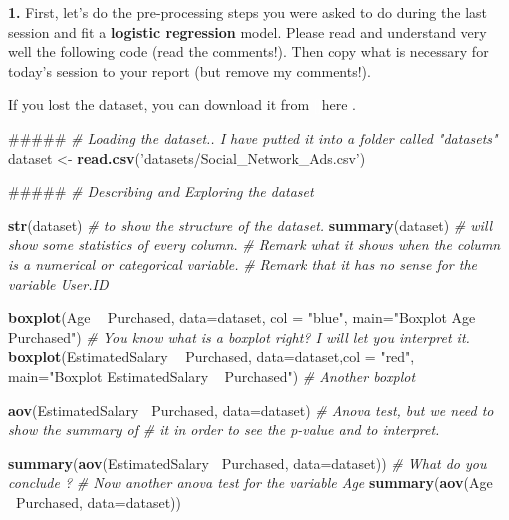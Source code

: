 \documentclass[]{book}
\newenvironment{Shaded}{\begin{snugshade}}{\end{snugshade}}
\newcommand{\KeywordTok}[1]{\textcolor[rgb]{0.13,0.29,0.53}{\textbf{#1}}}
\newcommand{\DataTypeTok}[1]{\textcolor[rgb]{0.13,0.29,0.53}{#1}}
\newcommand{\StringTok}[1]{\textcolor[rgb]{0.31,0.60,0.02}{#1}}
\newcommand{\CommentTok}[1]{\textcolor[rgb]{0.56,0.35,0.01}{\textit{#1}}}
\newcommand{\OperatorTok}[1]{\textcolor[rgb]{0.81,0.36,0.00}{\textbf{#1}}}
\newcommand{\NormalTok}[1]{#1}
\theoremstyle{definition}
\theoremstyle{definition}
\theoremstyle{definition}
\theoremstyle{remark}
\begin{document}
\textbf{1.} First, let's do the pre-processing steps you were asked to
do during the last session and fit a \textbf{logistic regression} model.
Please read and understand very well the following code (read the
comments!). Then copy what is necessary for today's session to your
report (but remove my comments!).

If you lost the dataset, you can download it from
\textcolor{white}{[}\faTable\textcolor{white}{]}here .

\begin{Shaded}
\begin{Highlighting}[]

\NormalTok{#####}
\CommentTok{# Loading the dataset.. I have putted it into a folder called "datasets"}
\NormalTok{dataset <-}\StringTok{ }\KeywordTok{read.csv}\NormalTok{(}\StringTok{'datasets/Social_Network_Ads.csv'}\NormalTok{)}

\NormalTok{#####}
\CommentTok{# Describing and Exploring the dataset}

\KeywordTok{str}\NormalTok{(dataset) }\CommentTok{# to show the structure of the dataset. }
\KeywordTok{summary}\NormalTok{(dataset) }\CommentTok{# will show some statistics of every column. }
\CommentTok{# Remark what it shows when the column is a numerical or categorical variable.}
\CommentTok{# Remark that it has no sense for the variable User.ID}

\KeywordTok{boxplot}\NormalTok{(Age }\OperatorTok{~}\StringTok{ }\NormalTok{Purchased, }\DataTypeTok{data=}\NormalTok{dataset, }\DataTypeTok{col =} \StringTok{"blue"}\NormalTok{, }\DataTypeTok{main=}\StringTok{"Boxplot Age ~ Purchased"}\NormalTok{)}
\CommentTok{# You know what is a boxplot right? I will let you interpret it.}
\KeywordTok{boxplot}\NormalTok{(EstimatedSalary }\OperatorTok{~}\StringTok{ }\NormalTok{Purchased, }\DataTypeTok{data=}\NormalTok{dataset,}\DataTypeTok{col =} \StringTok{"red"}\NormalTok{, }\DataTypeTok{main=}\StringTok{"Boxplot EstimatedSalary ~ Purchased"}\NormalTok{)}
\CommentTok{# Another boxplot}

\KeywordTok{aov}\NormalTok{(EstimatedSalary }\OperatorTok{~}\NormalTok{Purchased, }\DataTypeTok{data=}\NormalTok{dataset)}
\CommentTok{# Anova test, but we need to show the summary of }
\CommentTok{# it in order to see the p-value and to interpret.}

\KeywordTok{summary}\NormalTok{(}\KeywordTok{aov}\NormalTok{(EstimatedSalary }\OperatorTok{~}\NormalTok{Purchased, }\DataTypeTok{data=}\NormalTok{dataset))}
\CommentTok{# What do you conclude ?}
\CommentTok{# Now another anova test for the variable Age}
\KeywordTok{summary}\NormalTok{(}\KeywordTok{aov}\NormalTok{(Age }\OperatorTok{~}\NormalTok{Purchased, }\DataTypeTok{data=}\NormalTok{dataset))}


\end{Highlighting}
\end{Shaded}
\end{document}
